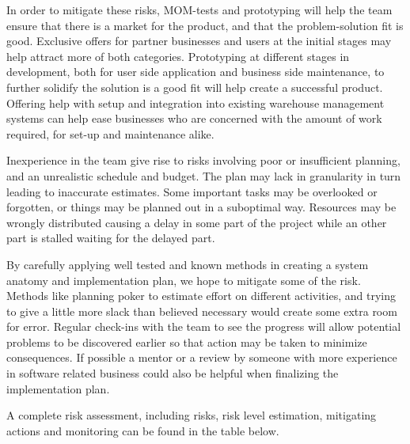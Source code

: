 \documentclass[titlepage]{article}
\begin{document}
In order to mitigate these risks, MOM-tests and prototyping will help the team ensure that there is a market for the product, and that the problem-solution fit is good. Exclusive offers for partner businesses and users at the initial stages may help attract more of both categories. Prototyping at different stages in development, both for user side application and business side maintenance, to further solidify the solution is a good fit will help create a successful product. Offering help with setup and integration into existing warehouse management systems can help ease businesses who are concerned with the amount of work required, for set-up and maintenance alike. 

Inexperience in the team give rise to risks involving poor or insufficient planning, and an unrealistic schedule and budget. The plan may lack in granularity in turn leading to inaccurate estimates. Some important tasks may be overlooked or forgotten, or things may be planned out in a suboptimal way. Resources may be wrongly distributed causing a delay in some part of the project while an other part is stalled waiting for the delayed part.

By carefully applying well tested and known methods in creating a system anatomy and implementation plan, we hope to mitigate some of the risk. Methods like planning poker to estimate effort on different activities, and trying to give a little more slack than believed necessary would create some extra room for error. Regular check-ins with the team to see the progress will allow potential problems to be discovered earlier so that action may be taken to minimize consequences. If possible a mentor or a review by someone with more experience in software related business could also be helpful when finalizing the implementation plan.

A complete risk assessment, including risks, risk level estimation, mitigating actions and monitoring can be found in the table below.
\end{document}
